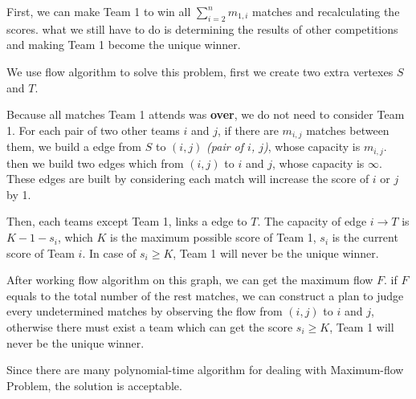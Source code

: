 First, we can make Team 1 to win all $\sum_{i=2}^{n}m_{1,i}$ matches and recalculating the scores. what we still have to do is determining the results of other competitions and making Team 1 become the unique winner.

We use flow algorithm to solve this problem, first we create two extra vertexes $S$ and $T$.

 Because all matches Team 1 attends was \textbf{over}, we do not need to consider Team 1. For each pair of two other teams $i$ and $j$, if there are $m_{i, j}$ matches between them, we build a edge from $S$ to $(i, j)$ \emph{(pair of $i$, $j$)}, whose capacity is $m_{i, j}$. then we build two edges which from $(i, j)$ to $i$ and $j$, whose capacity is $\infty$. These edges are built by considering each match will increase the score of $i$ or $j$ by 1.

Then, each teams except Team 1, links a edge to $T$. The capacity of edge $i \rightarrow T$ is $K - 1 - s_i$, which $K$ is the maximum possible score of Team 1, $s_i$ is the current score of Team $i$. In case of $s_i \geq K$, Team 1 will never be the unique winner.

After working flow algorithm on this graph, we can get the maximum flow $F$. if $F$ equals to the total number of the rest matches, we can construct a plan to judge every undetermined matches by observing the flow from $(i, j)$ to $i$ and $j$, otherwise there must exist a team which can get the score $s_i \geq K$, Team 1 will never be the unique winner.

Since there are many polynomial-time algorithm for dealing with Maximum-flow Problem, the solution is acceptable.
